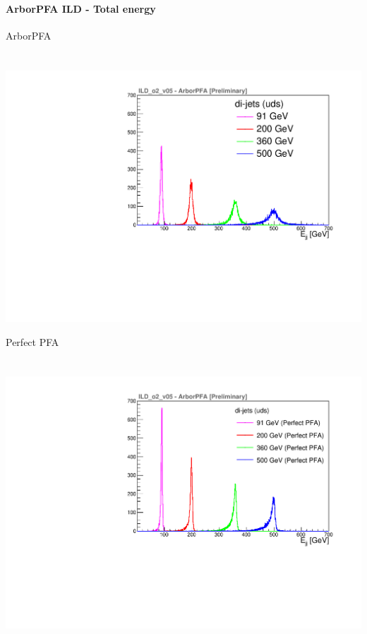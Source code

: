 \documentclass[8pt]{beamer}
\begin{document}
  \begin{frame}
  \frametitle{\backup}
  \framesubtitle{ArborPFA ILD - Total energy}
    \begin{minipage}{0.48\linewidth}
      \begin{center}
        ArborPFA \\
        ~ \\
        ~~~~~\includegraphics[width=\linewidth]{ILDArborPFA_ERec_NoNeutralHadron.pdf}
      \end{center}
    \end{minipage}
    \begin{minipage}{0.48\linewidth}
      \begin{center}
        Perfect PFA \\
        ~ \\
        ~~~~~\includegraphics[width=\linewidth]{ILDArborPFA_PerfectERec_NoNeutralHadron.pdf}
      \end{center}
    \end{minipage}
  \end{frame}
\end{document}
